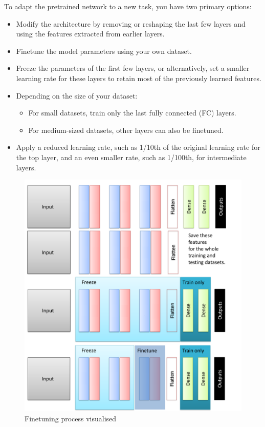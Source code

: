 To adapt the pretrained network to a new task, you have two primary options:
\begin{itemize}
    \item Modify the architecture by removing or reshaping the last few layers and using the features extracted from earlier layers.
    \item Finetune the model parameters using your own dataset.
        \item Freeze the parameters of the first few layers, or alternatively, set a smaller learning rate for these layers to retain most of the previously learned features.
        \item Depending on the size of your dataset:
        \begin{itemize}
            \item For small datasets, train only the last fully connected (FC) layers.
            \item For medium-sized datasets, other layers can also be finetuned.
        \end{itemize}
        \item Apply a reduced learning rate, such as 1/10th of the original learning rate for the top layer, and an even smaller rate, such as 1/100th, for intermediate layers.

\end{itemize}


\begin{figure}[H]
    \centering
    \includegraphics[width=0.7\linewidth]{img/finetune_freeze.png}
    \caption{Finetuning process visualised}
    
\end{figure}
